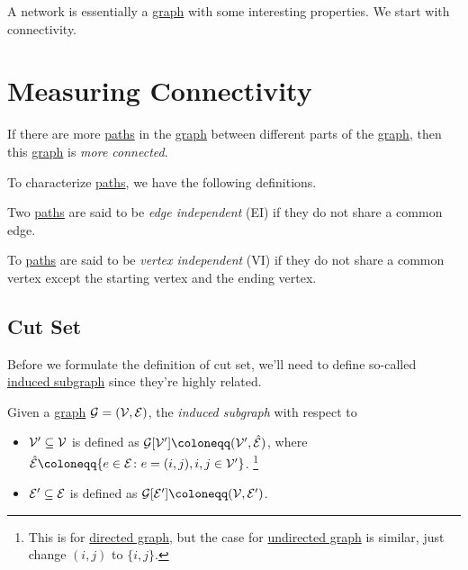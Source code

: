 A network is essentially a \hyperref[def:graph]{graph} with some interesting properties. We start with connectivity.

\section{Measuring Connectivity}
\begin{intuition}
	If there are more \hyperref[def:path]{paths} in the \hyperref[def:graph]{graph} between different parts of the \hyperref[def:graph]{graph}, then this
	\hyperref[def:graph]{graph} is \emph{more connected}.
\end{intuition}

To characterize \hyperref[def:path]{paths}, we have the following definitions.
\begin{definition}\label{def:edge-independent}
	Two \hyperref[def:path]{paths} are said to be \emph{edge independent} (EI) if they do not share a common edge.
\end{definition}

\begin{definition}\label{def:vertex-independent}
	To \hyperref[def:path]{paths} are said to be \emph{vertex independent} (VI) if they do not share a common vertex except the starting vertex and the ending vertex.
\end{definition}

\subsection{Cut Set}
Before we formulate the definition of cut set, we'll need to define so-called \hyperref[def:induced-subgraph]{induced subgraph} since they're highly related.

\begin{definition}\label{def:induced-subgraph}
	Given a \hyperref[def:graph]{graph} \(\mathcal{\MakeUppercase{g}} = (\mathcal{\MakeUppercase{v}} , \mathcal{\MakeUppercase{e}} )\), the \emph{induced subgraph} with respect to
	\begin{itemize}
		\item \(\mathcal{\MakeUppercase{v}}^\prime \subseteq \mathcal{\MakeUppercase{v}} \) is defined as
		      \(\mathcal{\MakeUppercase{g}} [\mathcal{\MakeUppercase{v}} ^\prime ] \coloneqq (\mathcal{\MakeUppercase{v}} ^\prime, \hat{\mathcal{\MakeUppercase{e}}})\),
		      where \(\hat{\mathcal{\MakeUppercase{e}} }\coloneqq \{e\in \mathcal{\MakeUppercase{e}} \colon e = (i, j), i, j\in \mathcal{\MakeUppercase{v}} ^\prime\}\).
		      \footnote{This is for \hyperref[def:directed-graph]{directed graph}, but the case for \hyperref[def:undirected-graph]{undirected graph} is similar, just change \((i, j)\) to \(\{i, j\}\).}
		\item \(\mathcal{\MakeUppercase{e}}^\prime \subseteq \mathcal{\MakeUppercase{e}} \) is defined as
		      \(\mathcal{\MakeUppercase{g}} [\mathcal{\MakeUppercase{e}} ^\prime ] \coloneqq (\mathcal{\MakeUppercase{v}} , \mathcal{\MakeUppercase{e}}^\prime )\).
	\end{itemize}
\end{definition}

